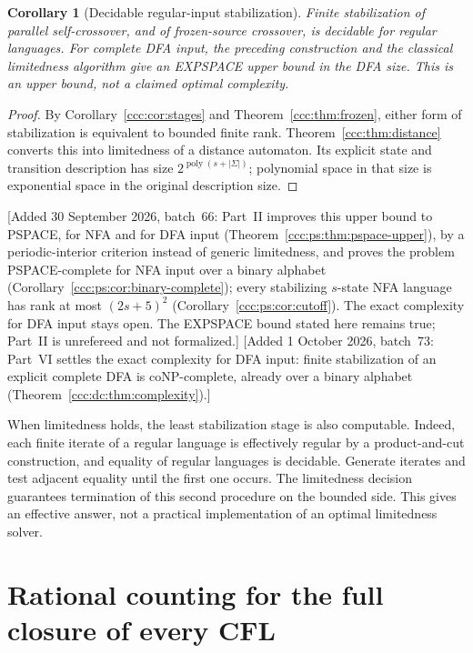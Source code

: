 \documentclass[11pt,letterpaper]{article}
\newtheorem{corollary}[theorem]{Corollary}
\theoremstyle{definition}
\theoremstyle{remark}
\newcommand{\poly}{\operatorname{poly}}
\newcommand{\wadd}[1]{\textup{[}Added 30 September 2026, batch~66: #1\textup{]}}
\newcommand{\waddsevthree}[1]{\textup{[}Added 1 October 2026, batch~73: #1\textup{]}}
\begin{document}
\begin{corollary}[Decidable regular-input stabilization]
\label{ccc:cor:regularstability}
Finite stabilization of parallel self-crossover, and of frozen-source
crossover, is decidable for regular languages. For complete DFA input, the preceding construction and the
classical limitedness algorithm give an EXPSPACE upper bound in the DFA
size. This is an upper bound, not a claimed optimal complexity.
\end{corollary}
\begin{proof}
By Corollary~\ref{ccc:cor:stages} and Theorem~\ref{ccc:thm:frozen}, either form of
stabilization is equivalent to bounded finite rank. Theorem~\ref{ccc:thm:distance} converts this into limitedness of a distance
automaton. Its explicit state and transition description has size
$2^{\poly(s+|\Sigma|)}$; polynomial space in that size is exponential space
in the original description size.
\end{proof}

\wadd{Part~II improves this upper bound to PSPACE, for NFA and for DFA input
(Theorem~\ref{ccc:ps:thm:pspace-upper}), by a periodic-interior criterion
instead of generic limitedness, and proves the problem PSPACE-complete for NFA
input over a binary alphabet (Corollary~\ref{ccc:ps:cor:binary-complete});
every stabilizing $s$-state NFA language has rank at most $(2s+5)^2$
(Corollary~\ref{ccc:ps:cor:cutoff}). The exact complexity for DFA input stays
open. The EXPSPACE bound stated here remains true; Part~II is unrefereed and
not formalized.}
\waddsevthree{Part~VI settles the exact complexity for DFA input: finite stabilization of an explicit complete DFA is coNP-complete, already over a binary alphabet (Theorem~\ref{ccc:dc:thm:complexity}).}

When limitedness holds, the least stabilization stage is also computable.
Indeed, each finite iterate of a regular language is effectively regular by
a product-and-cut construction, and equality of regular languages is
decidable. Generate iterates and test adjacent equality until the first one
occurs. The limitedness decision guarantees termination of this second
procedure on the bounded side. This gives an effective answer, not a practical
implementation of an optimal limitedness solver.

\section{Rational counting for the full closure of every CFL}
\label{ccc:sec:counting}
\end{document}
